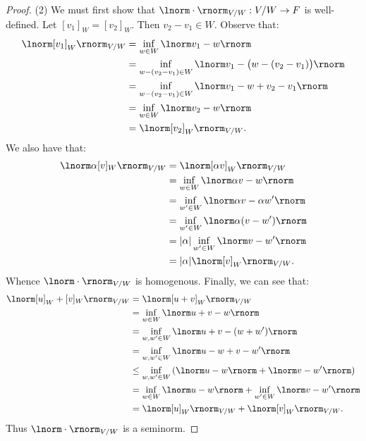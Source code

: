 \documentclass[11pt,twoside,openany]{memoir}
\begin{document}
\begin{proof}
            (2) We must first show that $\lnorm \cdot \rnorm_{V/W} : V/W \rightarrow F$ is well-defined. Let $[v_1]_W  = [v_2]_W$. Then $v_2 - v_1 \in W$. Observe that:
                \begin{equation*}
                \begin{split}
                    \lnorm [v_1]_W \rnorm_{V/W}
                    & = \inf_{w \in W} \lnorm v_1 - w \rnorm \\
                    & = \inf_{w - (v_2 - v_1) \in W} \lnorm v_1 - \bigl(w - (v_2 - v_1)\bigr) \rnorm  \\
                    & = \inf_{w - (v_2 - v_1) \in W} \lnorm v_1 - w + v_2 - v_1 \rnorm \\
                    & = \inf_{w \in W}\lnorm v_2 - w\rnorm \\
                    & = \lnorm [v_2]_W \rnorm_{V/W}.
                \end{split}
                \end{equation*}
            We also have that:
                \begin{equation*}
                \begin{split}
                    \lnorm \alpha [v]_W \rnorm_{V/W}
                    & = \lnorm [\alpha v]_W \rnorm_{V/W} \\
                    & = \inf_{w \in W}\lnorm \alpha v - w \rnorm \\
                    & = \inf_{w' \in W} \lnorm \alpha v - \alpha w' \rnorm \\
                    & = \inf_{w' \in W} \lnorm \alpha (v-w') \rnorm \\
                    & = |\alpha| \inf_{w' \in W} \lnorm v - w' \rnorm \\
                    & = |\alpha| \lnorm [v]_W \rnorm_{V/W}.
                \end{split}
                \end{equation*}
            Whence $\lnorm \cdot \rnorm_{V/W}$ is homogenous. Finally, we can see that:
                \begin{equation*}
                \begin{split}
                    \lnorm [u]_W + [v]_W \rnorm_{V/W}
                    & = \lnorm [u+v]_W \rnorm_{V/W} \\
                    & = \inf_{w \in W} \lnorm u+v - w \rnorm \\
                    & = \inf_{w,w' \in W} \lnorm u + v - (w + w') \rnorm \\
                    & = \inf_{w,w' \in W} \lnorm u-w + v-w' \rnorm \\
                    & \leq \inf_{w,w' \in W} \left( \lnorm  u-w\rnorm +  \lnorm v - w' \rnorm\right) \\
                    & = \inf_{w \in W}\lnorm u-w \rnorm + \inf_{w' \in W} \lnorm v - w' \rnorm \\
                    & = \lnorm [u]_W \rnorm_{V/W} + \lnorm [v]_W \rnorm_{V/W}.
                \end{split}
                \end{equation*}
            Thus $\lnorm \cdot \rnorm_{V/W}$ is a seminorm.
        \end{proof}
\end{document}
